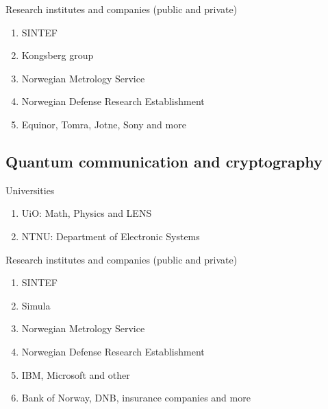 \documentclass[%
oneside,                 %
final,                   %
10pt]{article}
\begin{document}
\begin{block}{Research institutes and companies (public and private) }
\begin{enumerate}
\item SINTEF

\item Kongsberg group

\item Norwegian Metrology Service

\item Norwegian Defense Research Establishment

\item Equinor, Tomra, Jotne, Sony and more
\end{enumerate}

\noindent
\end{block}

\subsection{Quantum communication and cryptography}

\begin{block}{Universities }
\begin{enumerate}
\item UiO: Math, Physics and LENS

\item NTNU: Department of Electronic Systems
\end{enumerate}

\noindent
\end{block}

\begin{block}{Research institutes and companies (public and private) }
\begin{enumerate}
\item SINTEF

\item Simula

\item Norwegian Metrology Service

\item Norwegian Defense Research Establishment

\item IBM, Microsoft and other

\item Bank of Norway, DNB, insurance companies and more
\end{enumerate}

\noindent
\end{block}
\end{document}
